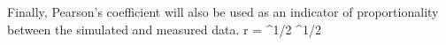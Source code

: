 Finally, Pearson's coefficient will also be used as an indicator of proportionality between the simulated and measured data.
\be
r =  {\left[\sum\limits_{i=1}^n (x_i-\overline{x})^2\right]^{1/2} \left[\sum\limits_{i=1}^n (y_i-\overline{y})^2\right]^{1/2}}
\ee 
